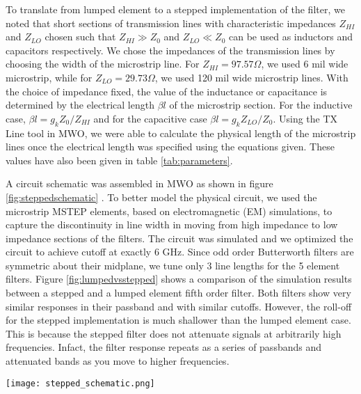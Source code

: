 \documentclass{article}
\begin{document}
To translate from lumped element to a stepped implementation of the filter, we noted that short sections of transmission lines with characteristic impedances $Z_{HI}$ and $Z_{LO}$ chosen such that $Z_{HI} \gg Z_0$ and $Z_{LO} \ll Z_0$ can be used as inductors and capacitors respectively. We chose the impedances of the transmission lines by choosing the width of the microstrip line. For $Z_{HI} = 97.57 \Omega$, we used 6 mil wide microstrip, while for $Z_{LO} = 29.73 \Omega$, we used 120 mil wide microstrip lines. With the choice of impedance fixed, the value of the inductance or capacitance is determined by the electrical length $\beta l$ of the microstrip section. For the inductive case, $\beta l = g_k Z_0 /Z_{HI}$ and for the capacitive case $\beta l = g_k Z_{LO}/Z_0 $. Using the TX Line tool in MWO, we were able to calculate the physical length of the microstrip lines once the electrical length was specified using the equations given. These values have also been given in table \ref{tab:parameters}. 


A circuit schematic was assembled in MWO as shown in figure \ref{fig:steppedschematic}  . To better model the physical circuit, we used the microstrip MSTEP elements, based on electromagnetic (EM) simulations, to capture the discontinuity in line width in moving from high impedance to low impedance sections of the filters. The circuit was simulated and we optimized the circuit to achieve cutoff at exactly 6 GHz. Since odd order Butterworth filters are symmetric about their midplane, we tune only 3 line lengths for the 5 element filters. Figure \ref{fig:lumpedvsstepped} shows a comparison of the simulation results between a stepped and a lumped element fifth order filter. Both filters show very similar responses in their passband and with similar cutoffs. However, the roll-off for the stepped implementation is much shallower than the lumped element case. This is because the stepped filter does not attenuate signals at arbitrarily high frequencies. Infact, the filter response repeats as a series of passbands and attenuated bands as you move to higher frequencies. 

\begin{figure*}[!htbp]
    \centering
    \texttt{[image: stepped\_schematic.png]}
    \caption{5th order Butterworth Low Pass Filter implementation using transmission line sections.}
    \label{fig:steppedschematic}
\end{figure*}
\end{document}
